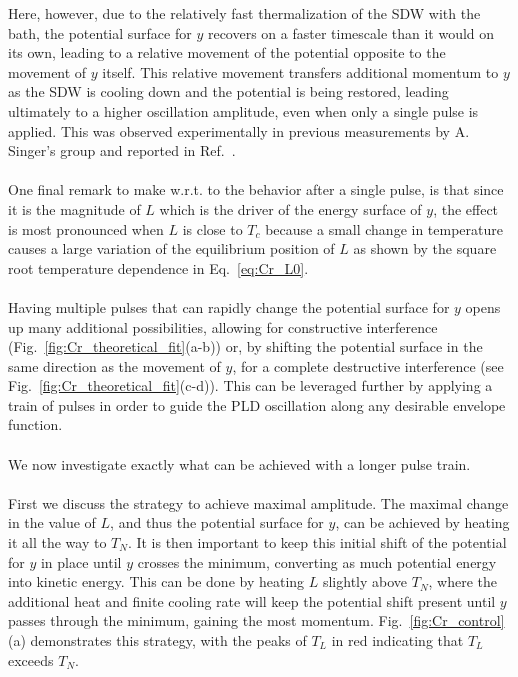 Here, however, due to the relatively fast thermalization of the SDW with the bath, the potential surface for $y$ recovers on a faster timescale than it would on its own, leading to a relative movement of the potential opposite to the movement of $y$ itself.
This relative movement transfers additional momentum to $y$ as the SDW is cooling down and the potential is being restored, leading ultimately to a higher oscillation amplitude, even when only a single pulse is applied.
This was observed experimentally in previous measurements by A. Singer's group and reported in Ref.~\cite{Singer2015prl}. 
\\\\
One final remark to make w.r.t. to the behavior after a single pulse, is that since it is the magnitude of $L$ which is the driver of the energy surface of $y$, the effect is most pronounced when $L$ is close to $T_c$ because a small change in temperature causes a large variation of the equilibrium position of $L$ as shown by the square root temperature dependence in Eq.~\eqref{eq:Cr_L0}.    
\\\\
Having multiple pulses that can rapidly change the potential surface for $y$ opens up many additional possibilities, allowing for constructive interference (Fig.~\ref{fig:Cr_theoretical_fit}(a-b)) or, by shifting the potential surface in the same direction as the movement of $y$, for a complete destructive interference (see Fig.~\ref{fig:Cr_theoretical_fit}(c-d)).
This can be leveraged further by applying a train of pulses in order to guide the PLD oscillation along any desirable envelope function.
\\\\
We now investigate exactly what can be achieved with a longer pulse train.
\\\\
First we discuss the strategy to achieve maximal amplitude.
The maximal change in the value of $L$, and thus the potential surface for $y$, can be achieved by heating it all the way to $T_N$.
It is then important to keep this initial shift of the potential for $y$ in place until $y$ crosses the minimum, converting as much potential energy into kinetic energy.
This can be done by heating $L$ slightly above $T_N$, where the additional heat and finite cooling rate will keep the potential shift present until $y$ passes through the minimum, gaining the most momentum.
Fig.~\ref{fig:Cr_control}(a) demonstrates this strategy, with the peaks of $T_L$ in red indicating that $T_L$ exceeds $T_N$.
